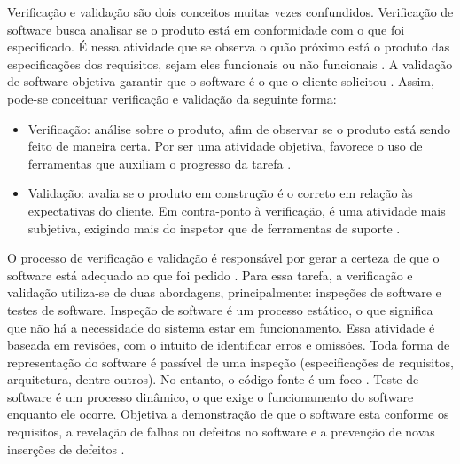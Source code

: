 \par
\indent Verificação e validação são dois conceitos muitas vezes confundidos. Verificação de software busca analisar se o produto está em conformidade com o que foi especificado. É nessa atividade que se observa o quão próximo está o produto das especificações dos requisitos, sejam eles funcionais ou não funcionais \cite{sommerville2007}. A validação de software objetiva garantir que o software é o que o cliente solicitou \cite{sommerville2007}. Assim, pode-se conceituar verificação e validação da seguinte forma:
\begin{itemize}
\item Verificação: análise sobre o produto, afim de observar se o produto está sendo feito de maneira certa. Por ser uma atividade objetiva, favorece o uso de ferramentas que auxiliam o progresso da tarefa \cite{sayao2007}.
\item Validação: avalia se o produto em construção é o correto em relação às expectativas do cliente. Em contra-ponto à verificação, é uma atividade mais subjetiva, exigindo mais do inspetor que de ferramentas de suporte \cite{sayao2007}.
\end{itemize}
\par
\indent O processo de verificação e validação é responsável por gerar a certeza de que o software está adequado ao que foi pedido \cite{sommerville2007}. Para essa tarefa, a verificação e validação utiliza-se de duas abordagens, principalmente: inspeções de software e testes de software. Inspeção de software é um processo estático, o que significa que não há a necessidade do sistema estar em funcionamento. Essa atividade é baseada em revisões, com o intuito de identificar erros e omissões. Toda forma de representação do software é passível de uma inspeção (especificações de requisitos, arquitetura, dentre outros). No entanto, o código-fonte é um foco \cite{sommerville2007}. Teste de software é um processo dinâmico, o que exige o funcionamento do software enquanto ele ocorre. Objetiva a demonstração de que o software esta conforme os requisitos, a revelação de falhas ou defeitos no software \cite{sommerville2007} e a prevenção de novas inserções de defeitos \cite{burkeCoyner2003}.

